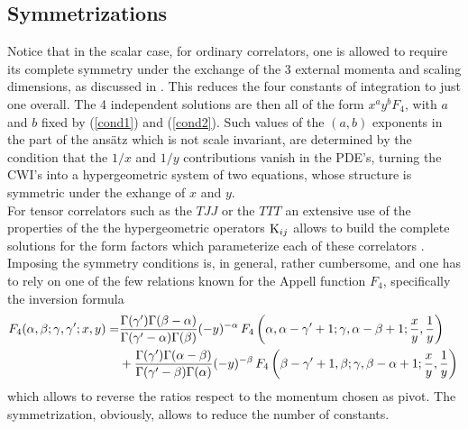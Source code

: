 \documentclass[a4paper,11pt,openright,twoside]{book}
\numberwithin{equation}{section}
\begin{document}
\subsection{Symmetrizations}
Notice that in the scalar case, for ordinary correlators, one is allowed to require its complete symmetry under the exchange of the 3 external momenta and scaling dimensions, as discussed in \cite{Coriano:2013jba}. This reduces the four
constants of integration to just one overall. The 4 independent solutions are then all of the form $x^a y^b F_4$, with
$a$ and $b$ fixed by (\ref{cond1}) and (\ref{cond2}). Such values of the $(a,b)$ exponents in the part of the ans\"atz which is not scale invariant, are determined by the condition that the $1/x$ and $1/y$ contributions vanish in the PDE's, turning the CWI's into a hypergeometric system of two equations, whose structure is symmetric under the exhange of $x$ and $y$.\\
For tensor correlators such as the $TJJ$ or the $TTT$ an extensive use of the properties of the the hypergeometric operators $\textup{K}_{ij}$ allows to build the complete solutions for the form factors which parameterize each of these correlators \cite{Coriano:2018bsy,Coriano:2018bbe}. Imposing the symmetry conditions is, in general, rather cumbersome, and one has to rely on one of the few relations known for the Appell function $F_4$, specifically the inversion formula 
\begin{align}
	\label{transfF41}
	F_4(\alpha, \beta; \gamma, \gamma'; x, y) =& \frac{\Gamma(\gamma') \Gamma(\beta - \alpha)}{ \Gamma(\gamma' - \alpha) \Gamma(\beta)} (- y)^{- \alpha} \, F_4\left(\alpha, \alpha -\gamma' +1; \gamma, \alpha-\beta +1; \frac{x}{y}, \frac{1}{y}\right) \notag\\ 
	&+  \frac{\Gamma(\gamma') \Gamma(\alpha - \beta)}{ \Gamma(\gamma' - \beta) \Gamma(\alpha)} (- y)^{- \beta} \, F_4\left(\beta -\gamma' +1, \beta ; \gamma, \beta-\alpha +1; \frac{x}{y}, \frac{1}{y}\right) \,
\end{align}
which allows to reverse the ratios respect to the momentum chosen as pivot. The symmetrization, obviously, allows to reduce the number of constants. 
\end{document}
